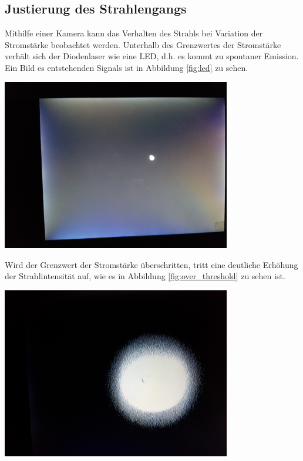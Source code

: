 \documentclass[captions=tableheading]{scrartcl}
\begin{document}
\subsection{Justierung des Strahlengangs}
Mithilfe einer Kamera kann das Verhalten des Strahls bei Variation der Stromstärke beobachtet werden. Unterhalb des Grenzwertes der Stromstärke verhält sich der Diodenlaser wie eine LED, d.h. es kommt zu spontaner Emission. Ein Bild es entstehenden Signals ist in Abbildung \ref{fig:led} zu sehen.
\begin{center}
	\includegraphics[width=10cm]{images/led_spot.jpg}
	\label{fig:led}
\end{center}
Wird der Grenzwert der Stromstärke überschritten, tritt eine deutliche Erhöhung der Strahlintensität auf, wie es in Abbildung \ref{fig:over_threshold} zu sehen ist. 
\begin{center}
	\includegraphics[width=10cm]{images/over_threshold.jpg}
	\label{fig:over_threshold}
\end{center}
\end{document}
